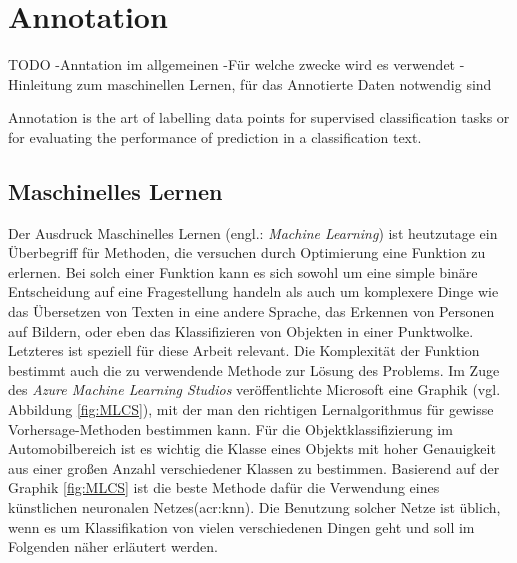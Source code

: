 \graphicspath{{Kapitel/Kapitel2_Grundlagen/Images/}}


\section{Annotation}
\label{sec:Annotation}
TODO
-Anntation im allgemeinen
-Für welche zwecke wird es verwendet
-Hinleitung zum maschinellen Lernen, für das Annotierte Daten notwendig sind

Annotation is the art of labelling data points for supervised classification tasks or for evaluating the performance of prediction in a classification text.

\subsection{Maschinelles Lernen}
\label{sec:MLearning}
Der Ausdruck Maschinelles Lernen (engl.: \textit{Machine Learning}) ist heutzutage ein Überbegriff für Methoden, die versuchen durch Optimierung eine Funktion zu erlernen. Bei solch einer Funktion kann es sich sowohl um eine simple binäre Entscheidung auf eine Fragestellung handeln als auch um komplexere Dinge wie das Übersetzen von Texten in eine andere Sprache, das Erkennen von Personen auf Bildern, oder eben das Klassifizieren von Objekten in einer Punktwolke. Letzteres ist speziell für diese Arbeit relevant. Die Komplexität der Funktion bestimmt auch die zu verwendende Methode zur Lösung des Problems. Im Zuge des \textit{Azure Machine Learning Studios} veröffentlichte Microsoft eine Graphik (vgl. Abbildung \ref{fig:MLCS}), mit der man den richtigen Lernalgorithmus für gewisse Vorhersage-Methoden bestimmen kann. Für die Objektklassifizierung im Automobilbereich ist es wichtig die Klasse eines Objekts mit hoher Genauigkeit aus einer großen Anzahl verschiedener Klassen zu bestimmen. Basierend auf der Graphik \ref{fig:MLCS} ist die beste Methode dafür die Verwendung eines künstlichen neuronalen Netzes(\acrshort{acr:knn}). Die Benutzung solcher Netze ist üblich, wenn es um Klassifikation von vielen verschiedenen Dingen geht und soll im Folgenden näher erläutert werden.\\

